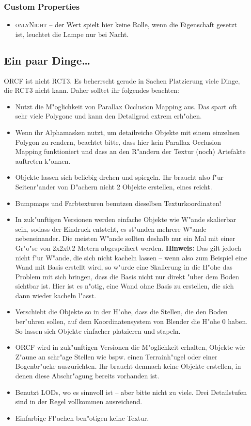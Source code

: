 \documentclass[a4paper]{article}
\newcommand{\ccaption}[1]{\textsc{#1}}
\newcommand{\note}[1]{\textbf{Hinweis:} #1 \par}
\begin{document}
\subsubsection{Custom Properties}
\begin{itemize}
\item \ccaption{onlyNight} -- der Wert spielt hier keine Rolle, wenn die Eigenschaft gesetzt ist, leuchtet die Lampe nur bei Nacht.
\end{itemize}

\subsection{Ein paar Dinge\dots }
ORCF ist nicht RCT3. Es beherrscht gerade in Sachen Platzierung viele Dinge, die RCT3 nicht kann. Daher solltet ihr folgendes beachten:
\begin{itemize}
\item Nutzt die M"oglichkeit von Parallax Occlusion Mapping aus. Das spart oft sehr viele Polygone und kann den Detailgrad extrem erh"ohen.
\item Wenn ihr Alphamasken nutzt, um detailreiche Objekte mit einem einzelnen Polygon zu rendern, beachtet bitte, dass hier kein Parallax Occlusion
  Mapping funktioniert und dass an den R"andern der Textur (noch) Artefakte auftreten k"onnen.
\item Objekte lassen sich beliebig drehen und spiegeln. Ihr braucht also f"ur Seitenr"ander von D"achern nicht 2 Objekte erstellen, eines reicht.
\item Bumpmaps und Farbtexturen benutzen dieselben Texturkoordinaten!
\item In zuk"unftigen Versionen werden einfache Objekte wie W"ande skalierbar sein, sodass der Eindruck entsteht, es st"unden mehrere W"ande
  nebeneinander. Die meisten W"ande sollten deshalb nur ein Mal mit einer Gr"o"se von 2x2x0.2 Metern abgespeihert werden. \note{Das gilt jedoch
  nicht f"ur W"ande, die sich nicht kacheln lassen -- wenn also zum Beispiel eine Wand mit Basis erstellt wird, so w"urde eine Skalierung in die H"ohe
  das Problem mit sich bringen, dass die Basis nicht nur direkt "uber dem Boden sichtbar ist. Hier ist es n"otig, eine Wand ohne Basis zu erstellen,
  die sich dann wieder kacheln l"asst.}
\item Verschiebt die Objekte so in der H"ohe, dass die Stellen, die den Boden ber"uhren sollen, auf dem Koordinatensystem von Blender die H"ohe 0 haben.
  So lassen sich Objekte einfacher platzieren und stapeln.
\item ORCF wird in zuk"unftigen Versionen die M"oglichkeit erhalten, Objekte wie Z"aune an schr"age Stellen wie bspw. einen Terrainh"ugel oder einer
  Bogenbr"ucke auszurichten. Ihr braucht demnach keine Objekte erstellen, in denen diese Abschr"agung bereits vorhanden ist.
\item Benutzt LODs, wo es sinnvoll ist -- aber bitte nicht zu viele. Drei Detailstufen sind in der Regel vollkommen ausreichend.
\item Einfarbige Fl"achen ben"otigen keine Textur.
\end{itemize}
\end{document}
